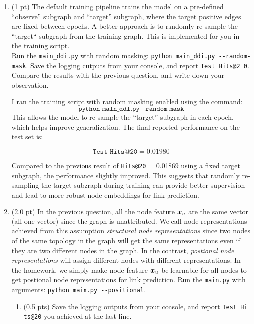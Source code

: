 \begin{enumerate}
%
\item 
    (1 pt)
    The default training pipeline trains the model on a pre-defined ``observe'' subgraph and ``target'' subgraph, where the target positive edges are fixed between epochs. A better approach is to randomly re-sample the ``target`` subgraph from the training graph. This is implemented for you in the training script. \\
    Run the \texttt{main\_ddi.py} with random masking: \verb|python main_ddi.py --random-mask|.
    Save the logging outputs from your console, and report \texttt{Test Hits@2%
    0}. Compare the results with the previous question, and write down your observation.

    I ran the training script with random masking enabled using the command:
\[
\texttt{python main\_ddi.py --random-mask}
\]
This allows the model to re-sample the ``target'' subgraph in each epoch, which helps improve generalization. The final reported performance on the test set is:

\[
\texttt{Test Hits@20} = 0.01980
\]

Compared to the previous result of \texttt{Hits@20} = 0.01869 using a fixed target subgraph, the performance slightly improved. This suggests that randomly re-sampling the target subgraph during training can provide better supervision and lead to more robust node embeddings for link prediction.
    
%
\item
    (2.0 pt)
    In the previous question, all the node feature $\bm{x}_{u}$ are the same
    vector (all-one vector) since the graph is unattributed.
    We call node representations achieved from this assumption \emph{structural
    node representations} since two nodes of the same topology in the graph
    will get the same representations even if they are two different nodes in
    the graph.
    In the contrast, \emph{postional node representations} will assign
    different nodes with different representations.
    In the homework, we simply make node feature $\bm{x}_{u}$ be learnable for all
    nodes to get postional node representations for link prediction.
    Run the \texttt{main.py} with arguments:
    \verb|python main.py --positional|.\\
    \begin{enumerate}
        \item (0.5 pts)
        Save the logging outputs from your console, and report \texttt{Test Hi%
        ts@20} you achieved at the last line.



\end{enumerate}
\end{enumerate}
